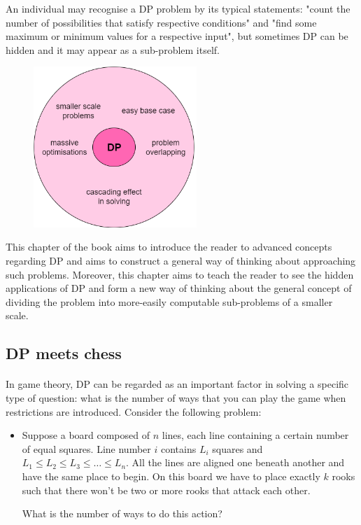 \documentclass[letterpaper]{article}
\begin{document}
An individual may recognise a DP problem by its typical statements: "count the number of possibilities that satisfy respective conditions" and "find some maximum or minimum values for a respective input", but sometimes DP can be hidden and it may appear as a sub-problem itself.

\begin{figure} [h!]
\centering
\includegraphics[width=0.55\textwidth]{pngOfDiagrams/dpbasics.png}
\end{figure}


This chapter of the book aims to introduce the reader to advanced concepts regarding DP and aims to construct a general way of thinking about approaching such problems. Moreover, this chapter aims to teach the reader to see the hidden applications of DP and form a new way of thinking about the general concept of dividing the problem into more-easily computable sub-problems of a smaller scale.

\newpage

\subsection{DP meets chess}

\paragraph{}

In game theory, DP can be regarded as an important factor in solving a specific type of question: what is the number of ways that you can play the game when restrictions are introduced. Consider the following problem:

\begin{itemize}
    \item Suppose a board composed of $n$ lines, each line containing a certain number of equal squares. Line number $i$ contains $L_{i}$ squares and $L_{1} \leq L_{2} \leq L_{3} \leq \dots \leq L_{n}$. All the lines are aligned one beneath another and have the same place to begin. On this board we have to place exactly $k$ rooks such that there won't be two or more rooks that attack each other.
    
    What is the number of ways to do this action?
\end{itemize}
\end{document}
